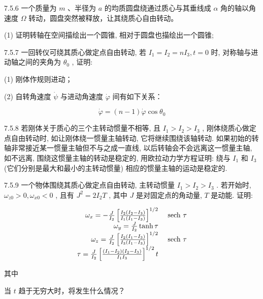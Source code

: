 \begin{problem}{7.5.6}
一个质量为 $m$ 、半径为 $a$ 的均质圆盘绕通过质心与其垂线成 $\alpha$ 角的轴以角速度 $\Omega$ 转动，圆盘突然被释放，让其绕质心自由转动。

(1) 证明转轴在空间描绘出一个圆锥, 相对于圆盘也描绘出一个圆锥;
\end{problem}
\clearpage


\begin{problem}{7.5.7}
一回转仪可绕其质心做定点自由转动, 若 $I_{1} = I_{2} = nI_{3}, t = 0$ 时, 对称轴与进动轴之间的夹角为 $\theta_{0}$ , 证明:

(1) 刚体作规则进动；

(2) 自转角速度 $\dot{\psi}$ 与进动角速度 $\dot{\varphi}$ 间有如下关系：

\[
\dot {\varphi} = (n - 1) \dot {\varphi} \cos \theta_ {0}
\]
\end{problem}
\clearpage


\begin{problem}{7.5.8}
若刚体关于质心的三个主转动惯量不相等, 且 $I_{1} > I_{2} > I_{3}$ , 刚体绕质心做定点自由转动时, 如让刚体绕一惯量主轴转动, 它将继续围绕该轴转动. 如果初始的转轴非常接近某一惯量主轴但不与之成一直线, 以后转轴会不会远离这一惯量主轴, 如不远离, 围绕这惯量主轴的转动是稳定的, 用欧拉动力学方程证明: 绕与 $I_{1}$ 和 $I_{3}$ (它们分别是最大和最小的主转动惯量) 相应的惯量主轴的运动是稳定的.
\end{problem}
\clearpage


\begin{problem}{7.5.9}
一个物体围绕其质心做定点自由转动, 主转动惯量 $I_{1} > I_{2} > I_{3}$ . 若开始时, $\omega_{z0} > 0, \omega_{x0} < 0$ , 且有 $J^{2} = 2I_{2}T$ , 其中 $J$ 是对固定点的角动量, $T$ 是动能. 证明:

\[
\begin{array}{r l} \omega_ {x} = - \frac {J}{I _ {2}} \left[ \frac {I _ {2} (I _ {2} - I _ {3})}{I _ {1} (I _ {1} - I _ {3})} \right] ^ {1 / 2} & \text { sech } \tau \\ \omega_ {y} = \frac {J}{I _ {2}} \tanh \tau \\ \omega_ {z} = \frac {J}{I _ {2}} \left[ \frac {I _ {2} (I _ {1} - I _ {3})}{I _ {3} (I _ {1} - I _ {3})} \right] ^ {1 / 2} & \text { sech } \tau \\ \tau = \frac {J}{I _ {2}} \left[ \frac {(I _ {1} - I _ {2}) (I _ {2} - I _ {3})}{I _ {1} I _ {3}} \right] ^ {1 / 2} t \end{array}
\]

其中

当 $t$ 趋于无穷大时，将发生什么情况？
\end{problem}
\clearpage


